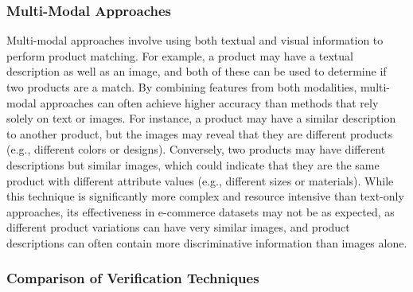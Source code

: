 \subsubsection{Multi-Modal Approaches}\label{subsubsec:multi_modal}

Multi-modal approaches involve using both textual and visual information to perform product matching.
For example, a product may have a textual description as well as an image, and both of these can be used to determine if two products are a match.
By combining features from both modalities, multi-modal approaches can often achieve higher accuracy than methods that rely solely on text or images.
For instance, a product may have a similar description to another product, but the images may reveal that they are different products (e.g., different colors or designs).
Conversely, two products may have different descriptions but similar images, which could indicate that they are the same product with different attribute values (e.g., different sizes or materials).
While this technique is significantly more complex and resource intensive than text-only approaches, its effectiveness in e-commerce datasets may not be as expected, as different product variations can have very similar images, and product descriptions can often contain more discriminative information than images alone.\cite{wilke2021towards}

\subsubsection{Comparison of Verification Techniques}\label{subsubsec:verification_comparison}

